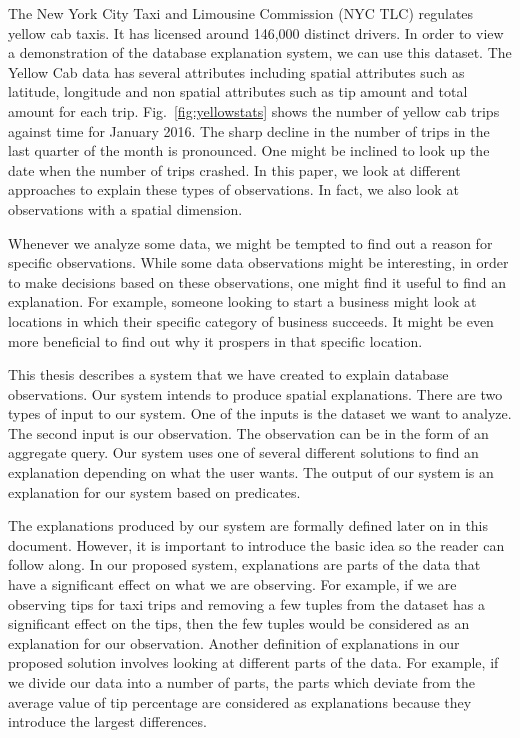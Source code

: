 The New York City Taxi and Limousine Commission (NYC TLC) regulates yellow cab taxis\citep{taxi2016tlc}. It has licensed around 146,000 distinct drivers. In order to view a demonstration of the database explanation system, we can use this dataset. The Yellow Cab data has several attributes including spatial attributes such as latitude, longitude and non spatial attributes such as tip amount and total amount for each trip. Fig.~\ref{fig:yellowstats} shows the number of yellow cab trips against time for January 2016. The sharp decline in the number of trips in the last quarter of the month is pronounced. One might be inclined to look up the date when the number of trips crashed. In this paper, we look at different approaches to explain these types of observations. In fact, we also look at observations with a spatial dimension.

Whenever we analyze some data, we might be tempted to find out a reason for specific observations. While some data observations might be interesting, in order to make decisions based on these observations, one might find it useful to find an explanation. For example, someone looking to start a business might look at locations in which their specific category of business succeeds. It might be even more beneficial to find out why it prospers in that specific location.

This thesis describes a system that we have created to explain database observations. Our system intends to produce spatial explanations. There are two types of input to our system. One of the inputs is the dataset we want to analyze. The second input is our observation. The observation can be in the form of an aggregate query. Our system uses one of several different solutions to find an explanation depending on what the user wants. The output of our system is an explanation for our system based on predicates.

The explanations produced by our system are formally defined later on in this document. However, it is important to introduce the basic idea so the reader can follow along. In our proposed system, explanations are parts of the data that have a significant effect on what we are observing. For example, if we are observing tips for taxi trips and removing a few tuples from the dataset has a significant effect on the tips, then the few tuples would be considered as an explanation for our observation. Another definition of explanations in our proposed solution involves looking at different parts of the data. For example, if we divide our data into a number of parts, the parts which deviate from the average value of tip percentage are considered as explanations because they introduce the largest differences.


